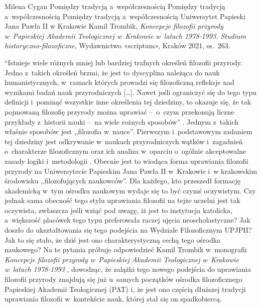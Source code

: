 \begin{newrevplenv}{Milena Cygan}
	{Pomiędzy tradycją a~współczesnością}
	{Pomiędzy tradycją a~współczesnością}
	{Pomiędzy tradycją a~współczesnością}
	{Uniwersytet Papieski Jana Pawła II w Krakowie}
	{Kamil Trombik, \textit{Koncepcje filozofii przyrody w~Papieskiej Akademii Teologicznej w~Krakowie w~latach 1978-1993. Studium historyczno-filozoficzne}, Wydawnictwo «scriptum», Kraków 2021, ss.~263.}




\lettrine[loversize=0.13,lines=2,lraise=-0.03,nindent=0em,findent=0.2pt]%
{``I}{}stnieje wiele różnych mniej lub bardziej trafnych określeń filozofii przyrody. Jedno z~takich określeń brzmi, że jest to dyscyplina należąca do nauk humanistycznych, w~ramach których prowadzi się filozoficzną refleksje nad wynikami badań nauk przyrodniczych […]. Nawet jeśli ograniczyć się do tego typu definicji i~pominąć wszystkie inne określenia tej dziedziny, to okazuje się, że tak pojmowaną filozofię przyrody można uprawiać --~o~czym przekonują liczne przykłady z~historii nauki --~na wiele rożnych sposobów''
\parencite[][s.~12]{heller_elementy_2007}. %
 Jednym z~takich właśnie sposobów jest ,,filozofia w~nauce''. Pierwszym i~podstawowym zadaniem tej dziedziny jest odkrywanie w~naukach przyrodniczych wątków i~zagadnień o~charakterze filozoficznym oraz ich analiza w~oparciu o~ogólnie akceptowalne zasady logiki i~metodologii 
\parencites[][]{heller_how_2019}[zob. także][]{polak_philosophy_2019}. %
Obecnie jest to wiodąca forma uprawiania filozofii przyrody na Uniwersytecie Papieskim Jana Pawła II w~Krakowie i~w krakowskim środowisku ,,filozofujących naukowców''. Dla każdego, kto przeszedł formację akademicką w~tym ośrodku naukowym wydaje się to być czymś oczywistym. Czy jednak sama obecność tego stylu uprawiania filozofii na tejże uczelni jest tak oczywista, zwłaszcza jeśli wziąć pod uwagę, iż jest to instytucja katolicka, a~większość placówek tego typu preferowała raczej ujęcia neoscholastyczne? Jak doszło do ukształtowania się tego podejścia na Wydziale Filozoficznym UPJPII? Jak to się stało, że dziś jest ono charakterystyczną cechą tego ośrodka naukowego? Na te pytania próbuje odpowiedzieć Kamil Trombik w~monografii \textit{Koncepcje filozofii przyrody w~Papieskiej Akademii Teologicznej w~Krakowie w~latach 1978-1993}
\parencite*[][]{trombik_koncepcje_2021}, %
 dowodząc, że zalążki tego nowego podejścia do uprawiania filozofii przyrody znajdują się już u~samych początków ośrodka filozoficznego Papieskiej Akademii Teologicznej (PAT) i, że jest ono częścią dłuższej tradycji uprawiania filozofii w~kontekście nauk, której stał się on spadkobiercą.


\end{newrevplenv}
